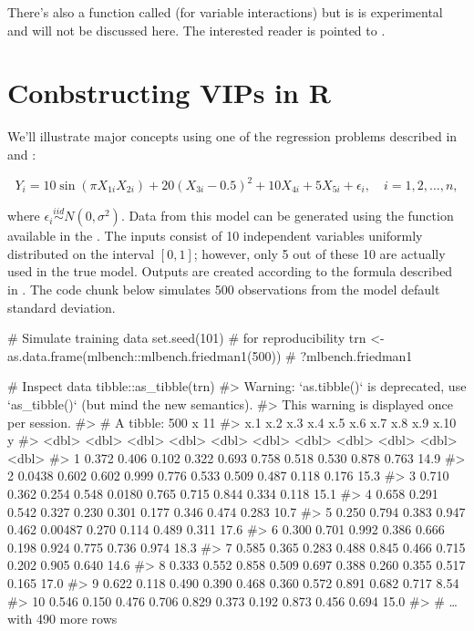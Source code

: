 There's also a function called  (for variable interactions) but is is experimental and will not be discussed here. The interested reader is pointed to \citet{greenwell-simple-2018}.


\section{Conbstructing VIPs in R}

We'll illustrate major concepts using one of the regression problems described in \citet{multivariate-friedman-1991} and \citet{bagging-breiman-1996}: 

\begin{equation}
  Y_i = 10 \sin\left(\pi X_{1i} X_{2i}\right) + 20 \left(X_{3i} - 0.5\right) ^ 2 + 10 X_{4i} + 5 X_{5i} + \epsilon_i, \quad i = 1, 2, \dots, n,
\end{equation}

where $\epsilon_i \stackrel{iid}{\sim} N\left(0, \sigma^2\right)$. Data from this model can be generated using the  function available in the  \citep{mlbench-pkg}. The inputs consist of 10 independent variables uniformly distributed on the interval $\left[0,1\right]$; however, only 5 out of these 10 are actually used in the true model. Outputs are created according to the formula described in . The code chunk below simulates 500 observations from the model default standard deviation.

\begin{example}
# Simulate training data
set.seed(101)  # for reproducibility
trn <- as.data.frame(mlbench::mlbench.friedman1(500))  # ?mlbench.friedman1

# Inspect data
tibble::as_tibble(trn)
#> Warning: `as.tibble()` is deprecated, use `as_tibble()` (but mind the new semantics).
#> This warning is displayed once per session.
#> # A tibble: 500 x 11
#>       x.1   x.2   x.3   x.4    x.5     x.6   x.7   x.8   x.9  x.10     y
#>     <dbl> <dbl> <dbl> <dbl>  <dbl>   <dbl> <dbl> <dbl> <dbl> <dbl> <dbl>
#>  1 0.372  0.406 0.102 0.322 0.693  0.758   0.518 0.530 0.878 0.763 14.9 
#>  2 0.0438 0.602 0.602 0.999 0.776  0.533   0.509 0.487 0.118 0.176 15.3 
#>  3 0.710  0.362 0.254 0.548 0.0180 0.765   0.715 0.844 0.334 0.118 15.1 
#>  4 0.658  0.291 0.542 0.327 0.230  0.301   0.177 0.346 0.474 0.283 10.7 
#>  5 0.250  0.794 0.383 0.947 0.462  0.00487 0.270 0.114 0.489 0.311 17.6 
#>  6 0.300  0.701 0.992 0.386 0.666  0.198   0.924 0.775 0.736 0.974 18.3 
#>  7 0.585  0.365 0.283 0.488 0.845  0.466   0.715 0.202 0.905 0.640 14.6 
#>  8 0.333  0.552 0.858 0.509 0.697  0.388   0.260 0.355 0.517 0.165 17.0 
#>  9 0.622  0.118 0.490 0.390 0.468  0.360   0.572 0.891 0.682 0.717  8.54
#> 10 0.546  0.150 0.476 0.706 0.829  0.373   0.192 0.873 0.456 0.694 15.0 
#> # … with 490 more rows
\end{example}

